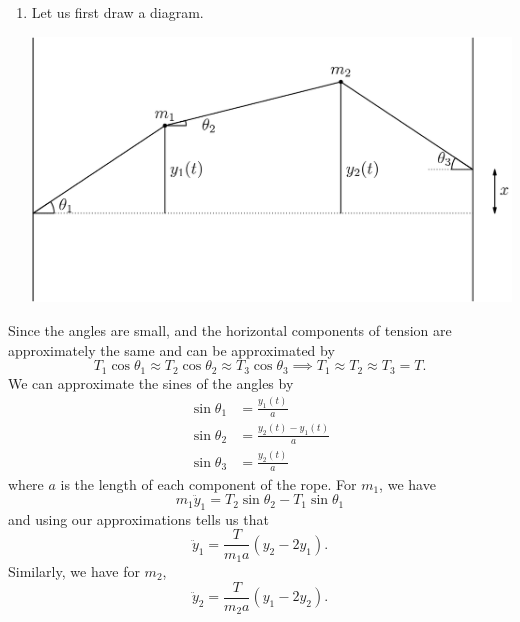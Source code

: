 \begin{sol}
\begin{enumerate}[label=\textbf{(\alph*)}] 
\item Let us first draw a diagram. 
\begin{center}
\includegraphics[width=\linewidth]{P03/ropes2.png}
\end{center}
\end{enumerate}
Since the angles are small, and the horizontal components of tension are approximately the same and can be approximated by 
\[T_1\cos\theta_1 \approx T_2\cos\theta_2 \approx T_3\cos\theta_3\implies T_1 \approx T_2 \approx T_3 = T.\]
We can approximate the sines of the angles by 
\begin{align*}
    \sin\theta_1 &= \frac{y_1(t)}{a} \\
    \sin\theta_2 &= \frac{y_2(t) - y_1(t)}{a} \\
    \sin\theta_3 &= \frac{y_2(t)}{a}
\end{align*}
where $a$ is the length of each component of the rope. For $m_1$, we have 
\[m_1 \ddot{y}_1 = T_2\sin\theta_2 - T_1\sin\theta_1\]
and using our approximations tells us that 
\[\boxed{\ddot{y}_1 = \frac{T}{m_1 a} (y_2 - 2y_1)}.\]
Similarly, we have for $m_2$, 
\[\boxed{\ddot{y}_2 = \frac{T}{m_2 a}(y_1 - 2y_2)}.\]

\item 
\end{sol}